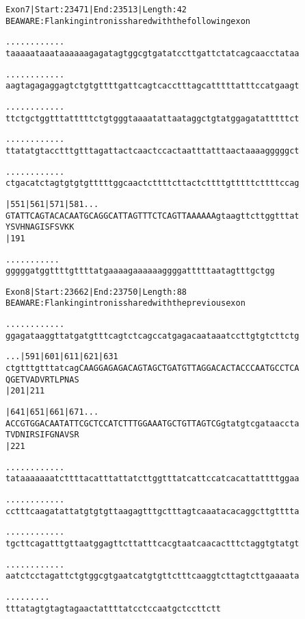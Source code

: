 \documentclass{article}
\begin{document}
\begin{alltt}
Exon 7 | Start: 23471 | End: 23513 | Length: 42
BE AWARE: Flanking intron is shared with the following exon

.    .    .    .    .    .    .    .    .    .    .    .    
taaaaataaataaaaaagagatagtggcgtgatatccttgattctatcagcaacctataa

.    .    .    .    .    .    .    .    .    .    .    .    
aagtagagaggagtctgtgttttgattcagtcacctttagcatttttatttccatgaagt

.    .    .    .    .    .    .    .    .    .    .    .    
ttctgctggtttatttttctgtgggtaaaatattaataggctgtatggagatatttttct

.    .    .    .    .    .    .    .    .    .    .    .    
ttatatgtacctttgtttagattactcaactccactaatttatttaactaaaagggggct

.    .    .    .    .    .    .    .    .    .    .    .    
ctgacatctagtgtgtgtttttggcaactcttttcttactcttttgtttttcttttccag

     |551      |561      |571      |581        .    .    .  
GTATTCAGTACACAATGCAGGCATTAGTTTCTCAGTTAAAAAAgtaagttcttggtttat
 Y  S  V  H  N  A  G  I  S  F  S  V  K  K                   
                         |191                               

  .    .    .    .    .    .    .    .    .    .    .  
gggggatggttttgttttatgaaaagaaaaaaggggatttttaatagtttgctgg
\end{alltt}
\newpage
\begin{alltt}
Exon 8 | Start: 23662 | End: 23750 | Length: 88
BE AWARE: Flanking intron is shared with the previous exon

.    .    .    .    .    .    .    .    .    .    .    .    
ggagataaggttatgatgtttcagtctcagccatgagacaataaatccttgtgtcttctg

.    .    .      |591      |601      |611      |621      |631
ctgtttgtttatcagCAAGGAGAGACAGTAGCTGATGTTAGGACACTACCCAATGCCTCA
               Q  G  E  T  V  A  D  V  R  T  L  P  N  A  S  
                           |201                          |211

       |641      |651      |661      |671       .    .    . 
ACCGTGGACAATATTCGCTCCATCTTTGGAAATGCTGTTAGTCGgtatgtcgataaccta
T  V  D  N  I  R  S  I  F  G  N  A  V  S  R                 
                           |221                             

   .    .    .    .    .    .    .    .    .    .    .    . 
tataaaaaaatcttttacatttattatcttggtttatcattccatcacattattttggaa

   .    .    .    .    .    .    .    .    .    .    .    . 
cctttcaagatattatgtgtgttaagagtttgctttagtcaaatacacaggcttgtttta

   .    .    .    .    .    .    .    .    .    .    .    . 
tgcttcagatttgttaatggagttcttatttcacgtaatcaacactttctaggtgtatgt

   .    .    .    .    .    .    .    .    .    .    .    . 
aatctcctagattctgtggcgtgaatcatgtgttctttcaaggtcttagtcttgaaaata

   .    .    .    .    .    .    .    .    .
tttatagtgtagtagaactattttatcctccaatgctccttctt
\end{alltt}
\end{document}
